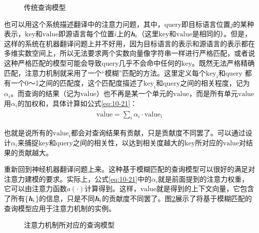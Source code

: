 \begin{figure}[htp]
\centering

\caption{传统查询模型}
\label{fig:10-22}
\end{figure}

\parinterval 也可以用这个系统描述翻译中的注意力问题，其中，$\mathrm{query}$即目标语言位置$j$的某种表示，$\mathrm{key}$和$\mathrm{value}$即源语言每个位置$i$上的${\textbf{\em h}_i}$（这里$\mathrm{key}$和$\mathrm{value}$是相同的）。但是，这样的系统在机器翻译问题上并不好用，因为目标语言的表示和源语言的表示都在多维实数空间上，所以无法要求两个实数向量像字符串一样进行严格匹配，或者说这种严格匹配的模型可能会导致$\mathrm{query}$几乎不会命中任何的$\mathrm{key}$。既然无法严格精确匹配，注意力机制就采用了一个“模糊”匹配的方法。这里定义每个$\mathrm{key}_i$和$\mathrm{query}$ 都有一个0～1之间的匹配度，这个匹配度描述了$\mathrm{key}_i$和$\mathrm{query}$之间的相关程度，记为$\alpha_i$。而查询的结果（记为$\overline{\mathrm{value}}$）也不再是某一个单元的$\mathrm{value}$，而是所有单元$\mathrm{value}$用$\alpha_i$的加权和，具体计算如公式\eqref{eq:10-21}：
\begin{eqnarray}
\overline{\mathrm{value}} = \sum_i \alpha_i \cdot {\mathrm{value}}_i
\label{eq:10-21}
\end{eqnarray}

\noindent 也就是说所有的$\mathrm{value}_i$都会对查询结果有贡献，只是贡献度不同罢了。可以通过设计$\alpha_i$来捕捉$\mathrm{key}$和$\mathrm{query}$之间的相关性，以达到相关度越大的$\mathrm{key}$所对应的$\mathrm{value}$对结果的贡献越大。

\parinterval 重新回到神经机器翻译问题上来。这种基于模糊匹配的查询模型可以很好的满足对注意力建模的要求。实际上，公式\eqref{eq:10-21}中的$\alpha_i$就是前面提到的注意力权重，它可以由注意力函数$a(\cdot)$计算得到。这样，$\overline{\mathrm{value}}$就是得到的上下文向量，它包含了所有\{$\textbf{\em h}_i$\}的信息，只是不同$\textbf{\em h}_i$的贡献度不同罢了。图\ref{fig:10-23}展示了将基于模糊匹配的查询模型应用于注意力机制的实例。

\begin{figure}[htp]
\centering

\caption{注意力机制所对应的查询模型}
\label{fig:10-23}
\end{figure}

